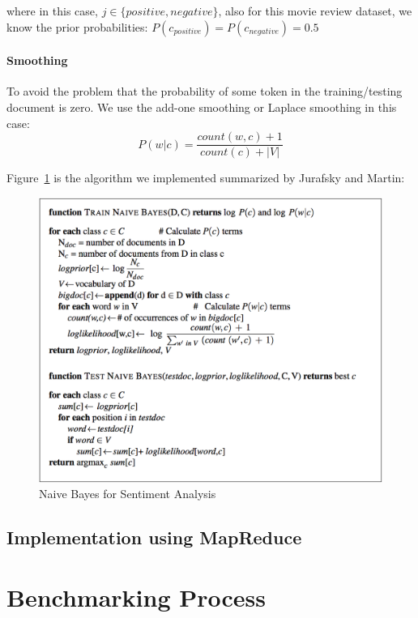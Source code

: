 where in this case, $j \in \{positive, negative\}$, also for this movie review 
dataset, we know the prior probabilities: 
$P(c_{positive})=P(c_{negative})=0.5$

\paragraph{Smoothing}
To avoid the problem that the probability of some token in the 
training/testing document is zero. We use the add-one smoothing or Laplace 
smoothing in this case:
\begin{equation*}
P(w|c) = \frac{count(w,c) + 1}{count(c) + |V|}
\end{equation*}

Figure~\ref{f:algo} is the algorithm we implemented summarized by Jurafsky 
and Martin:
\begin{figure}[!ht]
		\centering\includegraphics[width=\columnwidth]{images/algorithm.png}
		\caption{Naive Bayes for Sentiment 
		Analysis~\cite{hid-sp18-405-sentiment-jurafsky2009}}\label{f:algo}
\end{figure}

\subsection{Implementation using MapReduce}

\section{Benchmarking Process}


